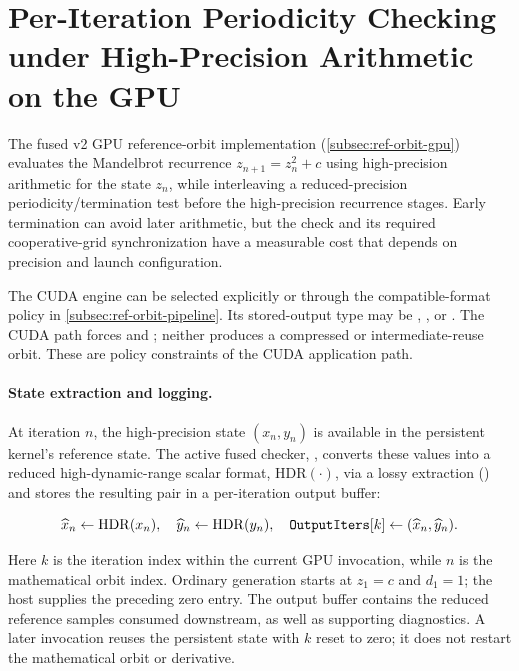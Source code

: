 \section{Per-Iteration Periodicity Checking under High-Precision Arithmetic on the GPU}
\label{sec:hp-periodicity}

The \FractalShark{} fused v2 GPU reference-orbit implementation
(\cref{subsec:ref-orbit-gpu}) evaluates the Mandelbrot recurrence
\(
z_{n+1} = z_n^2 + c
\)
using high-precision arithmetic for the state \(z_n\), while interleaving a
reduced-precision periodicity/termination test before the high-precision
recurrence stages.  Early termination can avoid later arithmetic, but the
check and its required cooperative-grid synchronization have a measurable cost
that depends on precision and launch configuration.

The CUDA engine can be selected explicitly or through the compatible-format
 policy in \cref{subsec:ref-orbit-pipeline}. Its stored-output type  may be
, , or
.  The CUDA path forces
 and ; neither produces
a compressed or intermediate-reuse orbit.  These are policy constraints of the
CUDA application path.

\paragraph{State extraction and logging.}

At iteration \(n\), the high-precision state \((x_n, y_n)\) is available in the
persistent kernel's reference state. The active fused checker,
, converts
these values into a reduced high-dynamic-range scalar format,
\(\mathrm{HDR}(\cdot)\), via a lossy extraction
() and stores the resulting pair in a per-iteration output
buffer:

\begin{equation}
  \widehat{x}_n \leftarrow \mathrm{HDR}(x_n), \quad
  \widehat{y}_n \leftarrow \mathrm{HDR}(y_n), \quad
  \texttt{OutputIters}[k] \leftarrow (\widehat{x}_n, \widehat{y}_n).
  \label{eq:hdr-extraction}
\end{equation}

Here $k$ is the iteration index within the current GPU invocation, while $n$
is the mathematical orbit index. Ordinary generation starts at $z_1=c$ and
$d_1=1$; the host supplies the preceding zero entry. The output buffer contains
the reduced reference samples consumed downstream, as well as supporting
diagnostics. A later invocation reuses the persistent state with $k$ reset
to zero; it does not restart the mathematical orbit or derivative.

